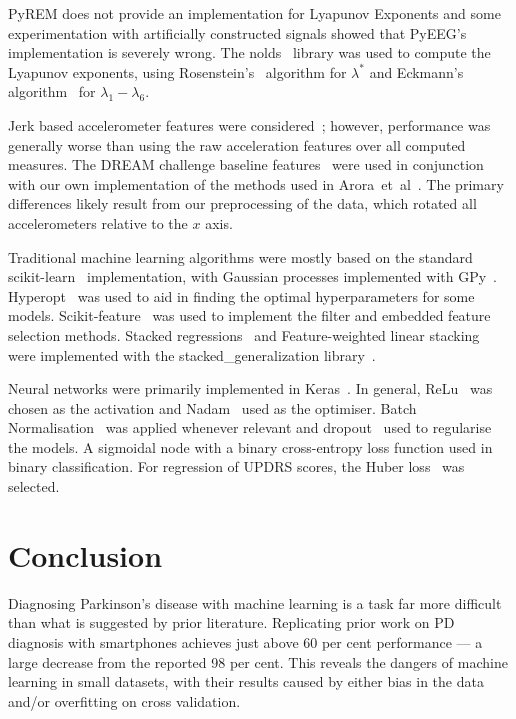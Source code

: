 \documentclass[12pt, twoside]{book}
\begin{document}
PyREM does not provide an implementation for Lyapunov Exponents and some experimentation with artificially constructed signals showed that PyEEG's implementation is severely wrong. The nolds~\cite{nolds} library was used to compute the Lyapunov exponents, using Rosenstein's~\cite{rosenstein1993practicallyapunov} algorithm for $\lambda^*$ and Eckmann's algorithm~\cite{eckmann1986liapunov} for $\lambda_1 - \lambda_6$.
  
Jerk based accelerometer features were considered~\cite{jerkfeature}; however, performance was generally worse than using the raw acceleration features over all computed measures. The DREAM challenge baseline features~\cite{mpowertools} were used in conjunction with our own implementation of the methods used in Arora~et~al~\cite{arora2014high}. The primary differences likely result from our preprocessing of the data, which rotated all accelerometers relative to the $x$ axis.


Traditional machine learning algorithms were mostly based on the standard scikit-learn~\cite{scikitlearn} implementation, with Gaussian processes implemented with GPy~\cite{gpy2014}. Hyperopt~\cite{hyperopt} was used to aid in finding the optimal hyperparameters for some models. Scikit-feature~\cite{skfeature} was used to implement the filter and embedded feature selection methods. Stacked regressions~\cite{stackregression} and Feature-weighted linear stacking~\cite{fwls} were implemented with the stacked\_generalization library~\cite{stackedgeneralizaton}.

Neural networks were primarily implemented in Keras~\cite{keras}. In general, ReLu~\cite{relu} was chosen as the activation and Nadam~\cite{nadam} used as the optimiser. Batch Normalisation~\cite{batchnorm} was applied whenever relevant and dropout~\cite{dropout} used to regularise the models. A sigmoidal node with a binary cross-entropy loss function used in binary classification. For regression of UPDRS scores, the Huber loss~\cite{huber1964robust} was selected.




\chapter{Conclusion}
Diagnosing Parkinson's disease with machine learning is a task far more difficult than what is suggested by prior literature. Replicating prior work on PD diagnosis with smartphones achieves just above 60 per cent performance --- a large decrease from the reported 98 per cent.  This reveals the dangers of machine learning in small datasets, with their results caused by either bias in the data and/or overfitting on cross validation.
\end{document}
